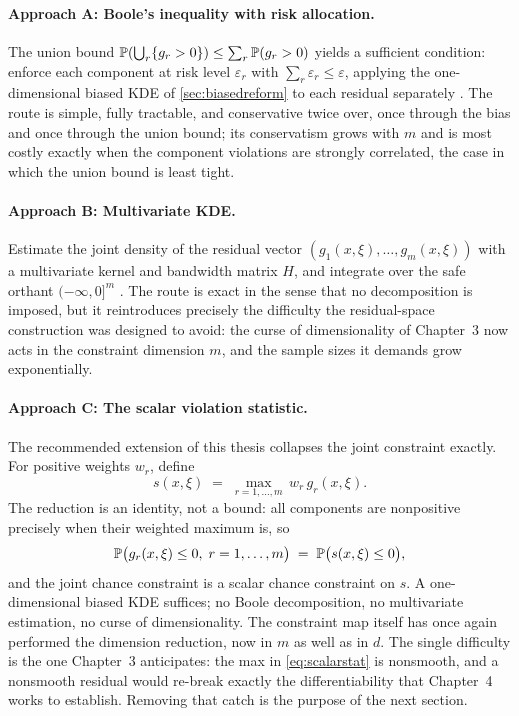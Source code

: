 \paragraph*{Approach A: Boole's inequality with risk allocation.} The union
bound $\mathbb{P}(\bigcup_r \{g_r > 0\}) \leq \sum_r \mathbb{P}(g_r > 0)$ yields a
sufficient condition: enforce each component at risk level $\varepsilon_r$
with $\sum_r \varepsilon_r \leq \varepsilon$, applying the
one-dimensional biased KDE of \cref{sec:biasedreform} to each residual
separately \citep{prekopa1995,keil2021}. The route is simple, fully
tractable, and conservative twice over, once through the bias and once
through the union bound; its conservatism grows with $m$ and is most
costly exactly when the component violations are strongly correlated,
the case in which the union bound is least tight.

\paragraph*{Approach B: Multivariate KDE.} Estimate the joint density of the
residual vector $(g_1(x,\xi),\dots,g_m(x,\xi))$ with a multivariate
kernel and bandwidth matrix $H$, and integrate over the safe orthant
$(-\infty,0]^m$ \citep{wu2021,wu2023}. The route is exact in the sense
that no decomposition is imposed, but it reintroduces precisely the
difficulty the residual-space construction was designed to avoid: the
curse of dimensionality of Chapter~3 now acts in the constraint
dimension $m$,
and the sample sizes it demands grow exponentially.

\paragraph*{Approach C: The scalar violation statistic.} The recommended
extension of this thesis collapses the joint constraint exactly. For
positive weights $w_r$, define
\begin{equation}
  s(x,\xi) \;=\; \max_{r = 1,\dots,m} \, w_r\, g_r(x,\xi) .
  \label{eq:scalarstat}
\end{equation}
The reduction is an identity, not a bound: all components are
nonpositive precisely when their weighted maximum is, so
\begin{equation}
  \mathbb{P}\bigl(g_r(x,\xi) \leq 0,\; r = 1,\dots,m\bigr)
  \;=\; \mathbb{P}\bigl(s(x,\xi) \leq 0\bigr) ,
  \label{eq:exactreduction}
\end{equation}
and the joint chance constraint is a scalar chance constraint on
$s$. A one-dimensional biased KDE suffices; no Boole decomposition, no
multivariate estimation, no curse of dimensionality. The constraint map
itself has once again performed the dimension reduction, now in $m$ as
well as in $d$. The single difficulty is the one Chapter~3 anticipates: the
max in \cref{eq:scalarstat} is nonsmooth, and a nonsmooth residual would
re-break exactly the differentiability that Chapter~4 works to
establish. Removing that catch is the purpose of the next section.

